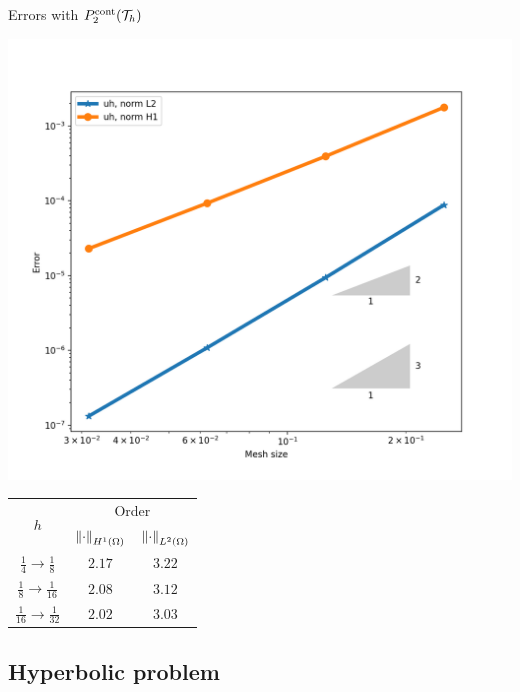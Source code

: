 	\begin{frame}{Errors with $\relax{P}^{\text{cont}}_2(\mathcal{T}_h)$}
		\begin{minipage}{0.50\textwidth}
			\centering
			\includegraphics[scale=0.30]{img/Difusion/errores_difusion_P2c.png}
		\end{minipage}
		\begin{minipage}{0.49\textwidth}
			\centering
			\begin{tabular}{|c|c|c|}
				\hline 
				\multirow{2}{*}{$h$} & \multicolumn{2}{c|}{Order} \\
				\cline{2-3}
				 & $\left\|\cdot\right\|_{H^1(\Omega)}$ & $\left\|\cdot\right\|_{L^2(\Omega)}$\\ 
				\hline
				\hline
				$\frac{1}{4}\to\frac{1}{8}$ & $2.17$ & $3.22$  \\ 
				\hline 
				$\frac{1}{8}\to\frac{1}{16}$ & $2.08$ & $3.12$ \\ 
				\hline 
				$\frac{1}{16}\to\frac{1}{32}$ & $2.02$ & $3.03$ \\
				\hline
			\end{tabular}
		\end{minipage}
		\end{frame}

\subsection{Hyperbolic problem}

